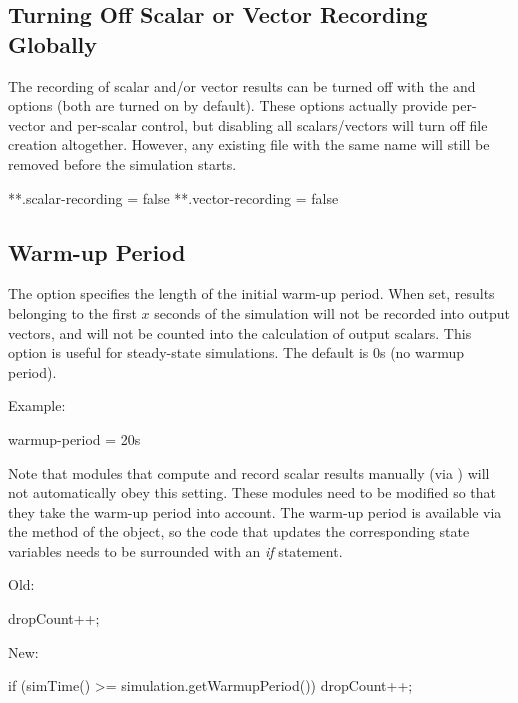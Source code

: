 \subsection{Turning Off Scalar or Vector Recording Globally}

The recording of scalar and/or vector results can be turned off with
the  and  options (both
are turned on by default). These options actually provide per-vector
and per-scalar control, but disabling all scalars/vectors will turn off
file creation altogether. However, any existing file with the same name
will still be removed before the simulation starts.

\begin{inifile}
**.scalar-recording = false
**.vector-recording = false
\end{inifile}


\subsection{Warm-up Period}
\label{sec:ana-sim:warmup-period}

The  option specifies the length of the initial
warm-up period. When set, results belonging to the first $x$ seconds
of the simulation will not be recorded into output vectors, and will
not be counted into the calculation of output scalars.
This option is useful for steady-state simulations. The default is 0s
(no warmup period).

Example:

\begin{inifile}
warmup-period = 20s
\end{inifile}

Note that modules that compute and record scalar results manually
(via ) will not automatically obey this setting.
These modules need to be modified so that they take the warm-up period
into account. The warm-up period is available via the
 method of the  object,
so the code that updates the corresponding state variables needs
to be surrounded with an \textit{if} statement.

Old:

\begin{cpp}
dropCount++;
\end{cpp}

New:

\begin{cpp}
if (simTime() >= simulation.getWarmupPeriod())
    dropCount++;
\end{cpp}


